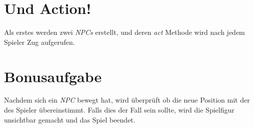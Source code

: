 \documentclass{pi1}
\begin{document}
\section{Und Action!}

Als erstes werden zwei \textit{NPCs} erstellt, und deren \textit{act} Methode wird nach jedem Spieler Zug aufgerufen.

\newpage

\section{Bonusaufgabe}

Nachdem sich ein \textit{NPC} bewegt hat, wird überprüft ob die neue Position mit der des Spieler übereinstimmt. Falls dies der Fall sein sollte, wird die Spielfigur unsichtbar gemacht und das Spiel beendet.
\end{document}

